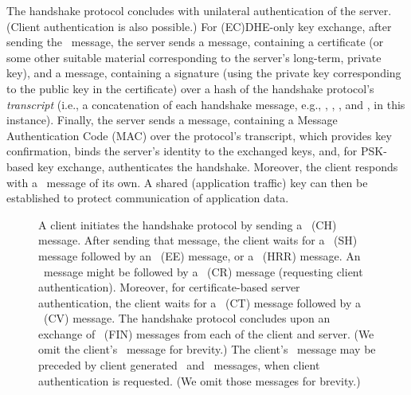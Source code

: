 The handshake protocol concludes with unilateral authentication of the 
server. (Client authentication is also possible.) For (EC)DHE-only key 
exchange, after sending the \EncryptedExtensions\ message, the server sends 
a \emph{\Certificate} message, containing a certificate (or some other 
suitable material corresponding to the server's long-term, private key), 
and a \emph{\CertificateVerify} message, containing a signature 
(using the private key corresponding to the public key in the certificate)
over a hash of the handshake protocol's \emph{transcript} (i.e., a 
concatenation of each handshake message, e.g., \ClientHello, \ServerHello,
\EncryptedExtensions, and \Certificate, in this instance).
Finally, the server 
sends a \emph{\Finished} message, containing a Message Authentication Code (MAC) 
over the protocol's transcript, which provides key confirmation, binds 
the server's identity to the exchanged keys, and, for PSK-based
key exchange, authenticates the handshake. Moreover,
the client responds with a \Finished\ message of its own. A shared (application
traffic) key can then be established to protect communication of application data. 

\begin{figure}
\caption[Handshake protocol]{
  A client initiates the handshake protocol by sending a \ClientHello\ (CH) message. 
  After sending that message, the client waits for a \ServerHello\ (SH) message 
  followed by an \EncryptedExtensions\ (EE) message, or a \HelloRetryRequest\ (HRR) 
  message. An \EncryptedExtensions\ message might be followed by a \CertificateRequest\
  (CR) message (requesting client authentication). Moreover, for certificate-based
  server authentication, the client waits for a \Certificate\ (CT) message followed 
  by a \CertificateVerify\ (CV) message. The handshake protocol concludes upon 
  an exchange of  \Finished\ (FIN) messages from each of the client and server. 
  (We omit the client's \Finished\ message for brevity.) The client's \Finished\ 
  message may be preceded by client generated \Certificate\ and \CertificateVerify\ 
  messages, when client authentication is requested. (We omit those messages for
  brevity.) 
}
\label{fig:handshake}
\end{figure}

